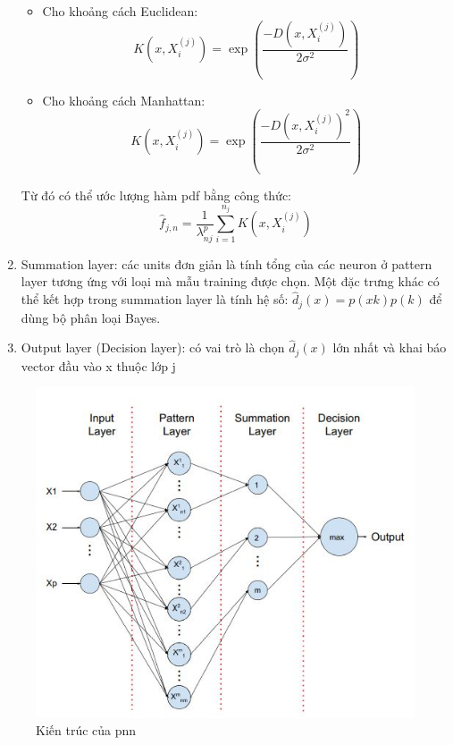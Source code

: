 \begin{enumerate}
\begin{itemize}
\begin{equation}
		\end{equation}
		\item Cho khoảng cách Euclidean:
		\begin{equation}
		K(x, X_i^{(j)}) = \exp{(\frac{-D(x, X_i^{(j)})}{2\sigma^2})}
		\end{equation}
		\item Cho khoảng cách Manhattan:
		\begin{equation}
		K(x, X_i^{(j)}) = \exp{(\frac{-D(x, X_i^{(j)})^2}{2\sigma^2})}
		\end{equation}
	\end{itemize}
	Từ đó có thể ước lượng hàm \ac{pdf} bằng công thức:
	\begin{equation}
	\hat f_{j, n} = \frac{1}{\lambda _{nj}^p}\sum_{i=1}^{n_j}K(x, X_i^{(j)})
	\end{equation}
	\item Summation layer: các units đơn giản là tính tổng của các neuron ở pattern layer tương ứng với loại mà mẫu training được chọn. Một đặc trưng khác có thể kết hợp trong summation layer là tính hệ số: $\hat d_j(x) = p(x 		k)p(k)$ để dùng bộ phân loại Bayes.
	\item Output layer (Decision layer): có vai trò là chọn $\hat d_j(x)$ lớn nhất và khai báo vector đầu vào x thuộc lớp j
\end{enumerate}
\begin{figure} [ht]
	\centering
	\captionsetup{justification=centering}
	\includegraphics [scale=1] {Image/PNN_architecture}
	\caption{Kiến trúc của \ac{pnn}}
\end{figure}
